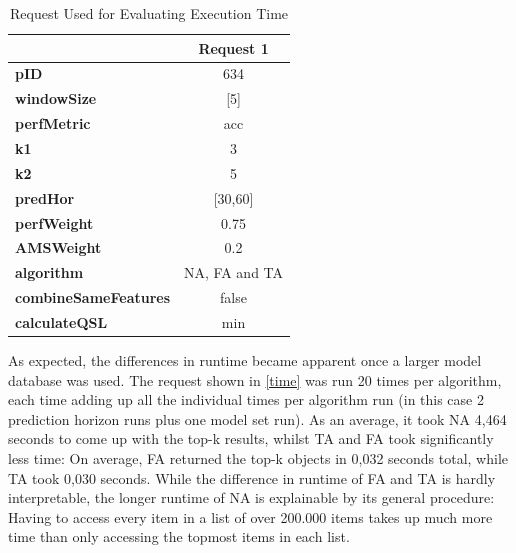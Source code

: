 \begin{table}[h]
\centering
    \begin{tabular}{ l | c}
        \toprule
        &
\textbf{Request 1}      
 \\\midrule

\textbf{pID} & 634 \\\midrule
\textbf{windowSize} & [5] \\\midrule
\textbf{perfMetric} & acc  \\\midrule
\textbf{k1} & 3\\\midrule
\textbf{k2} & 5 \\\midrule
\textbf{predHor} & [30,60]\\\midrule
\textbf{perfWeight} & 0.75 \\\midrule
\textbf{AMSWeight} & 0.2\\\midrule
\textbf{algorithm}  & NA, FA and TA  \\\midrule
\textbf{combineSameFeatures} & false \\\midrule
\textbf{calculateQSL} & min \\
        \bottomrule
    \end{tabular}
\caption{Request Used for Evaluating Execution Time} \label{time}
\end{table}


As expected, the differences in runtime became apparent once a larger model database was used. The request shown in \autoref{time} was run 20 times per algorithm, each time adding up all the individual times per algorithm run (in this case 2 prediction horizon runs plus one model set run). As an average, it took NA 4,464 seconds to come up with the top-k results, whilst TA and FA took significantly less time: On average, FA returned the top-k objects in 0,032 seconds total, while TA took 0,030 seconds. While the difference in runtime of FA and TA is hardly interpretable, the longer runtime of NA is explainable by its general procedure: Having to access every item in a list of over 200.000 items takes up much more time than only accessing the topmost items in each list. 

